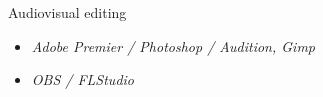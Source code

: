 \vspace{2mm}
\hspace{-2mm}
{\fontsize{12}{10}\selectfont \hspace{3.8mm} Audiovisual editing}\newline
\vspace{-6mm}
\begin{itemize}[noitemsep]
    \item[\tiny\ding{110}] \textit{Adobe Premier / Photoshop / Audition, Gimp}
    \item[\tiny\ding{110}] \textit{OBS / FLStudio}
\end{itemize}
\vspace{2mm}
